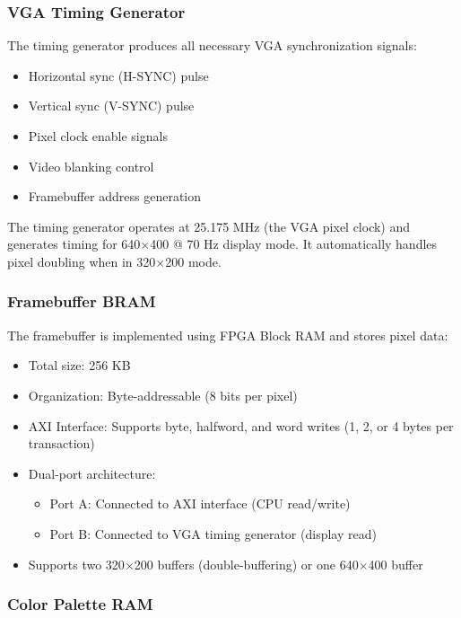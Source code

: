 \documentclass[11pt,letterpaper]{report}
\begin{document}
\subsubsection{VGA Timing Generator}

The timing generator produces all necessary VGA synchronization signals:

\begin{itemize}
    \item Horizontal sync (H-SYNC) pulse
    \item Vertical sync (V-SYNC) pulse
    \item Pixel clock enable signals
    \item Video blanking control
    \item Framebuffer address generation
\end{itemize}

The timing generator operates at 25.175 MHz (the VGA pixel clock) and generates timing for 640$\times$400 @ 70 Hz display mode. It automatically handles pixel doubling when in 320$\times$200 mode.

\subsubsection{Framebuffer BRAM}

The framebuffer is implemented using FPGA Block RAM and stores pixel data:

\begin{itemize}
    \item Total size: 256 KB
    \item Organization: Byte-addressable (8 bits per pixel)
    \item AXI Interface: Supports byte, halfword, and word writes (1, 2, or 4 bytes per transaction)
    \item Dual-port architecture:
    \begin{itemize}
        \item Port A: Connected to AXI interface (CPU read/write)
        \item Port B: Connected to VGA timing generator (display read)
    \end{itemize}
    \item Supports two 320$\times$200 buffers (double-buffering) or one 640$\times$400 buffer
\end{itemize}

\subsubsection{Color Palette RAM}
\end{document}
